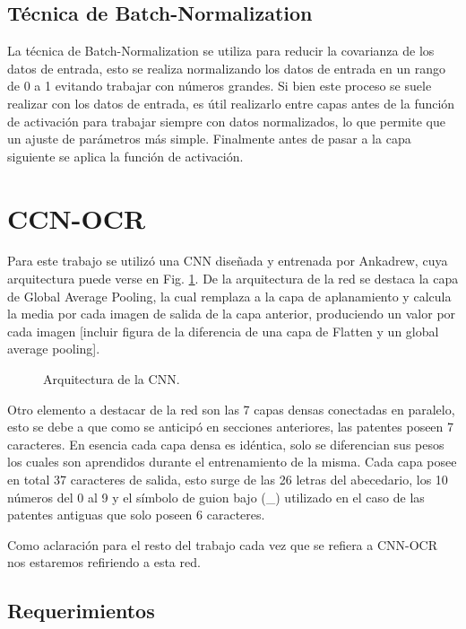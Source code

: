 \subsection{Técnica de Batch-Normalization}

La técnica de Batch-Normalization se utiliza para reducir la covarianza de los datos de entrada, esto se realiza normalizando los datos de entrada en un rango de 0 a 1 evitando trabajar con números grandes. Si bien este proceso se suele realizar con los datos de entrada, es útil realizarlo entre capas antes de la función de activación para trabajar siempre con datos normalizados, lo que permite que un ajuste de parámetros más simple. Finalmente antes de pasar a la capa siguiente se aplica la función de activación.

\section{CCN-OCR}

Para este trabajo se utilizó una CNN diseñada y entrenada por Ankadrew, cuya arquitectura puede verse en Fig. \ref{fig:arquitectura-cnn-ocr}. De la arquitectura de la red se destaca la capa de Global Average Pooling, la cual remplaza a la capa de aplanamiento y calcula la media por cada imagen de salida de la capa anterior, produciendo un valor por cada imagen [incluir figura de la diferencia de una capa de Flatten y un global average pooling].
\begin{figure}
    \centering
    \caption{Arquitectura de la CNN.}
    \label{fig:arquitectura-cnn-ocr}
\end{figure}

Otro elemento a destacar de la red son las 7 capas densas conectadas en paralelo, esto se debe a que como se anticipó en secciones anteriores, las patentes poseen 7 caracteres. En esencia cada capa densa es idéntica, solo se diferencian sus pesos los cuales son aprendidos durante el entrenamiento de la misma. Cada capa posee en total 37 caracteres de salida, esto surge de las 26 letras del abecedario, los 10 números del 0 al 9 y el símbolo de guion bajo (\_) utilizado en el caso de las patentes antiguas que solo poseen 6 caracteres.

Como aclaración para el resto del trabajo cada vez que se refiera a CNN-OCR nos estaremos refiriendo a esta red.

\subsection{Requerimientos}

